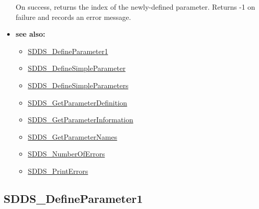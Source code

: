 \documentclass[11pt]{article}
\newcommand{\progref}[1]{\hyperref{SDDS_#1}{{\tt SDDS\_#1} (}{)}{SDDS_#1}}
\begin{document}
\begin{itemize}
On success, returns the index of the newly-defined parameter. Returns -1 on failure and records an error message.
\item {\bf see also:}
\begin{itemize}
\item \progref{DefineParameter1}
\item \progref{DefineSimpleParameter}
\item \progref{DefineSimpleParameters}
\item \progref{GetParameterDefinition}
\item \progref{GetParameterInformation}
\item \progref{GetParameterNames}
\item \progref{NumberOfErrors}
\item \progref{PrintErrors}
\end{itemize}
\end{itemize}

\subsection{SDDS\_DefineParameter1}
\label{SDDS_DefineParameter1}
\end{document}

